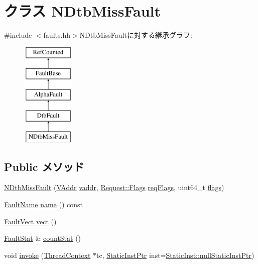 \hypertarget{classAlphaISA_1_1NDtbMissFault}{
\section{クラス NDtbMissFault}
\label{classAlphaISA_1_1NDtbMissFault}
}


{\ttfamily \#include $<$faults.hh$>$}NDtbMissFaultに対する継承グラフ:\begin{figure}[H]
\begin{center}
\leavevmode
\includegraphics[height=5cm]{classAlphaISA_1_1NDtbMissFault}
\end{center}
\end{figure}
\subsection*{Public メソッド}
\begin{DoxyCompactItemize}
\item 
\hyperlink{classAlphaISA_1_1NDtbMissFault_a47ceca6a0cb3454cf788705e9abc1510}{NDtbMissFault} (\hyperlink{structAlphaISA_1_1VAddr}{VAddr} \hyperlink{classAlphaISA_1_1DtbFault_a48d5190e0fd672e7fe9d248a670b8ea3}{vaddr}, \hyperlink{classFlags}{Request::Flags} \hyperlink{classAlphaISA_1_1DtbFault_a4342a385c094b40ed46b0674fbb0b223}{reqFlags}, uint64\_\-t \hyperlink{classAlphaISA_1_1DtbFault_a899a76dc5f03f0d4ea3793c339e07ee9}{flags})
\item 
\hyperlink{sim_2faults_8hh_abb196df64725e5c2568c900cf130d8d7}{FaultName} \hyperlink{classAlphaISA_1_1NDtbMissFault_a73adb23259baf912a81683a9790a303f}{name} () const 
\item 
\hyperlink{classm5_1_1params_1_1Addr}{FaultVect} \hyperlink{classAlphaISA_1_1NDtbMissFault_ae15c5d7ab0162821b93d668d0b225198}{vect} ()
\item 
\hyperlink{classStats_1_1Scalar}{FaultStat} \& \hyperlink{classAlphaISA_1_1NDtbMissFault_a6c79663c761ff57265459f7e3aefaf4c}{countStat} ()
\item 
void \hyperlink{classAlphaISA_1_1NDtbMissFault_a2bd783b42262278d41157d428e1f8d6f}{invoke} (\hyperlink{classThreadContext}{ThreadContext} $\ast$tc, \hyperlink{classRefCountingPtr}{StaticInstPtr} inst=\hyperlink{classStaticInst_aa793d9793af735f09096369fb17567b6}{StaticInst::nullStaticInstPtr})
\end{DoxyCompactItemize}
